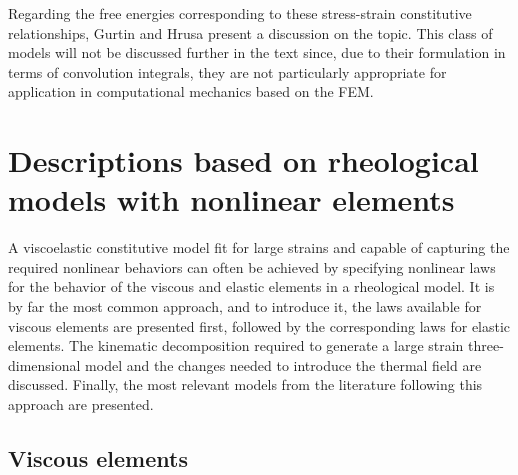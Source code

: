 Regarding the free energies corresponding to these stress-strain constitutive relationships, Gurtin and Hrusa \citep{gurtinEnergiesNonlinearViscoelastic1988} present a discussion on the topic.
This class of models will not be discussed further in the text since, due to their formulation in terms of convolution integrals, they are not particularly appropriate for application in computational mechanics based on the FEM.

\section{Descriptions based on rheological models with nonlinear elements}

A viscoelastic constitutive model fit for large strains and capable of capturing the required nonlinear behaviors can often be achieved by specifying nonlinear laws for the behavior of the viscous and elastic elements in a rheological model.
It is by far the most common approach, and to introduce it, the laws available for viscous elements are presented first, followed by the corresponding laws for elastic elements.
The kinematic decomposition required to generate a large strain three-dimensional model and the changes needed to introduce the thermal field are discussed.
Finally, the most relevant models from the literature following this approach are presented.


\subsection{Viscous elements}
\label{sec:viscous_elements}

